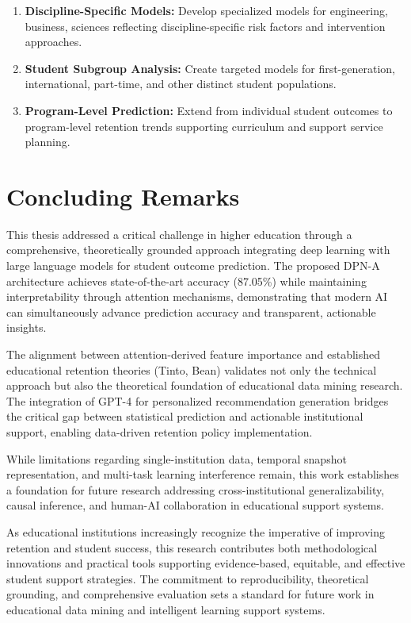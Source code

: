 \begin{enumerate}
\item \textbf{Discipline-Specific Models:} Develop specialized models for engineering, business, sciences reflecting discipline-specific risk factors and intervention approaches.

\item \textbf{Student Subgroup Analysis:} Create targeted models for first-generation, international, part-time, and other distinct student populations.

\item \textbf{Program-Level Prediction:} Extend from individual student outcomes to program-level retention trends supporting curriculum and support service planning.
\end{enumerate}

\section{Concluding Remarks}

This thesis addressed a critical challenge in higher education through a comprehensive, theoretically grounded approach integrating deep learning with large language models for student outcome prediction. The proposed DPN-A architecture achieves state-of-the-art accuracy (87.05\%) while maintaining interpretability through attention mechanisms, demonstrating that modern AI can simultaneously advance prediction accuracy and transparent, actionable insights.

The alignment between attention-derived feature importance and established educational retention theories (Tinto, Bean) validates not only the technical approach but also the theoretical foundation of educational data mining research. The integration of GPT-4 for personalized recommendation generation bridges the critical gap between statistical prediction and actionable institutional support, enabling data-driven retention policy implementation.

While limitations regarding single-institution data, temporal snapshot representation, and multi-task learning interference remain, this work establishes a foundation for future research addressing cross-institutional generalizability, causal inference, and human-AI collaboration in educational support systems.

As educational institutions increasingly recognize the imperative of improving retention and student success, this research contributes both methodological innovations and practical tools supporting evidence-based, equitable, and effective student support strategies. The commitment to reproducibility, theoretical grounding, and comprehensive evaluation sets a standard for future work in educational data mining and intelligent learning support systems.

